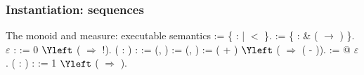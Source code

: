 \begin{frame}
  \frametitle{Instantiation: sequences}
  \begin{block}{The monoid and measure: executable semantics}
    \scriptsize{   := \{  :  |  $<$  \}.\coqdoceol
      := \{  :  \& (  \ensuremath{\rightarrow} ) \}.\coqdoceol
     $\varepsilon$ :  := 0 $\Yleft$ ( \coqdocid{\_} \ensuremath{\Rightarrow} !).\coqdoceol
      (  : ) :  := \coqdoceol
    \coqdocindent{1.00em}
     (, ) :=  
     (, ) :=  \coqdoceol
    \coqdocindent{2.00em}
    ( + ) $\Yleft$ \coqdoceol
    \coqdocindent{3.00em}
    (  \ensuremath{\Rightarrow} 
       
       
    ( - )).\coqdoceol
      := @  $\varepsilon$  \coqdocid{\_} \coqdocid{\_} \coqdocid{\_}.\coqdoceol
      ( : ) :  := 1 $\Yleft$ ( \coqdocid{\_} \ensuremath{\Rightarrow} ).\coqdoceol
  }
  \end{block}


\end{frame}
